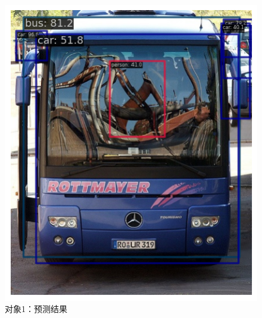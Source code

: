 \documentclass[notitlepage,cs4size,punct,oneside]{ctexrep}
\numberwithin{equation}{chapter}
\theoremstyle{mystyle}
\begin{document}
\begin{figure}[!htpb]
\begin{minipage}[t]{0.49\textwidth}
    \includegraphics[width=\linewidth]{1result.png}
    \caption{对象1：预测结果}
    \label{frcnn_loss}
    \end{minipage}
\end{figure}
\end{document}
